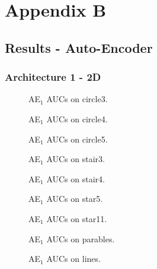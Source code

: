 \chapter{Appendix B}
\label{app:appendix_b}

\section{Results - Auto-Encoder}
\subsection{Architecture 1 - 2D}
\label{subsec:results_ae_24142}
\begin{figure}[h!]
         \centering
         
         \caption{AE$_1$ AUCs on circle3.}
\end{figure}
\begin{figure}[h!]
         \centering
         
         \caption{AE$_1$ AUCs on circle4.}
\end{figure}
\begin{figure}[h!]
         \centering
         
         \caption{AE$_1$ AUCs on circle5.}
\end{figure}
\begin{figure}[h!]
         \centering
         
         \caption{AE$_1$ AUCs on stair3.}
\end{figure}
\begin{figure}[h!]
         \centering
         
         \caption{AE$_1$ AUCs on stair4.}
\end{figure}
\begin{figure}[h!]
         \centering
         
         \caption{AE$_1$ AUCs on star5.}
\end{figure}
\begin{figure}[h!]
         \centering
         
         \caption{AE$_1$ AUCs on star11.}
\end{figure}
\begin{figure}[h!]
         \centering
         
         \caption{AE$_1$ AUCs on parables.}
\end{figure}
\begin{figure}[h!]
         \centering
         
         \caption{AE$_1$ AUCs on lines.}
\end{figure}
\clearpage

